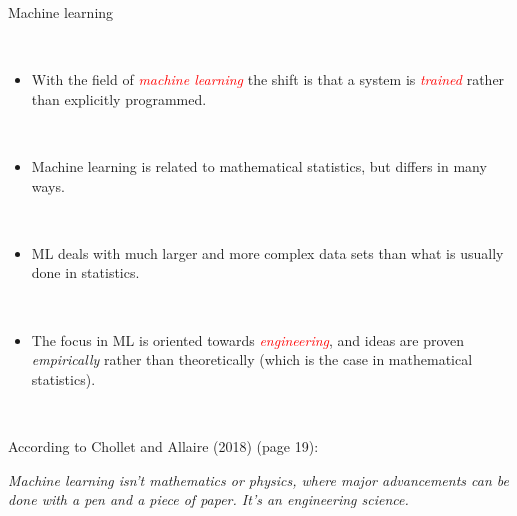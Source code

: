 \documentclass[10pt,ignorenonframetext,]{beamer}
\providecommand{\tightlist}{%
  \setlength{\itemsep}{0pt}\setlength{\parskip}{0pt}}
\begin{document}
\begin{frame}

\begin{block}{Machine learning}

\(~\)

\begin{itemize}
\tightlist
\item
  With the field of \emph{\textcolor{red}{machine learning}} the shift
  is that a system is \emph{\textcolor{red}{trained}} rather than
  explicitly programmed.
\end{itemize}

\(~\)

\begin{itemize}
\tightlist
\item
  Machine learning is related to mathematical statistics, but differs in
  many ways.
\end{itemize}

\(~\)

\begin{itemize}
\tightlist
\item
  ML deals with much larger and more complex data sets than what is
  usually done in statistics.
\end{itemize}

\(~\)

\begin{itemize}
\tightlist
\item
  The focus in ML is oriented towards
  \emph{\textcolor{red}{engineering}}, and ideas are proven
  \emph{empirically} rather than theoretically (which is the case in
  mathematical statistics).
\end{itemize}

\(~\)

According to Chollet and Allaire (2018) (page 19): \vspace{2mm}

\emph{Machine learning isn't mathematics or physics, where major
advancements can be done with a pen and a piece of paper. It's an
engineering science.}

\end{block}

\end{frame}
\end{document}

